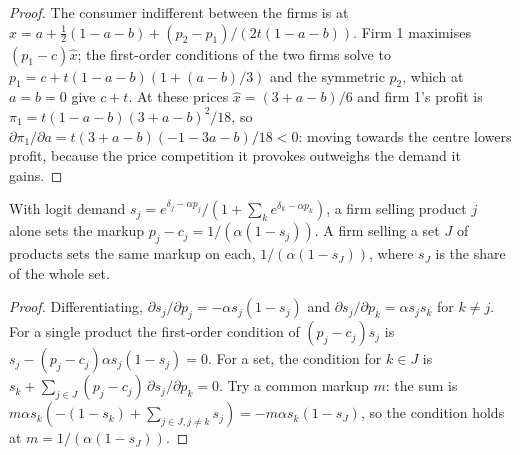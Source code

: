 \begin{proof}
The consumer indifferent between the firms is at
$\hat x = a + \tfrac{1}{2}(1 - a - b) + (p_2 - p_1)/(2t(1 - a - b))$. Firm 1 maximises $(p_1 - c)\hat x$; the first-order
conditions of the two firms solve to $p_1 = c + t(1 - a - b)(1 + (a - b)/3)$ and the symmetric $p_2$, which at
$a = b = 0$ give $c + t$. At these prices $\hat x = (3 + a - b)/6$ and firm 1's profit is
$\pi_1 = t(1 - a - b)(3 + a - b)^2/18$, so $\partial \pi_1/\partial a = t(3 + a - b)(-1 - 3a - b)/18 < 0$: moving towards the centre lowers profit,
because the price competition it provokes outweighs the demand it gains.
\end{proof}

\begin{omfigure}
\par{}
\end{omfigure}

\begin{proposition}\label{prop:b3:oligopoly-and-collusion:logit}
With logit demand $s_j = e^{\delta_j - \alpha p_j}/(1 + \sum_k e^{\delta_k - \alpha p_k})$, a firm selling product $j$ alone sets the
markup $p_j - c_j = 1/(\alpha(1 - s_j))$. A firm selling a set $J$ of products sets the same markup on
each, $1/(\alpha(1 - s_J))$, where $s_J$ is the share of the whole set.
\end{proposition}

\begin{proof}
Differentiating, $\partial s_j/\partial p_j = -\alpha s_j(1 - s_j)$ and $\partial s_j/\partial p_k = \alpha s_j s_k$ for $k \ne j$. For a single
product the first-order condition of $(p_j - c_j)s_j$ is $s_j - (p_j - c_j)\alpha s_j(1 - s_j) = 0$. For a set, the
condition for $k \in J$ is $s_k + \sum_{j \in J}(p_j - c_j)\,\partial s_j/\partial p_k = 0$. Try a common markup $m$: the sum is
$m\alpha s_k(-(1 - s_k) + \sum_{j \in J, j \ne k} s_j) = -m\alpha s_k(1 - s_J)$, so the condition holds at $m = 1/(\alpha(1 - s_J))$.
\end{proof}

